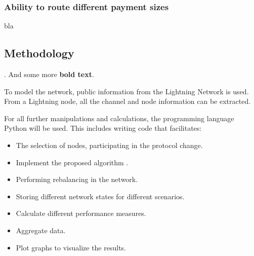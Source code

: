 \documentclass[final]{fhnwreport}       %
\begin{document}
\subsubsection{Ability to route different payment sizes}
bla
\subsection{Methodology}
. And some more \textbf{bold text}.

To model the network, public information from the Lightning Network is used. From a Lightning node, all the channel and node information can be extracted.

For all further manipulations and calculations, the programming language Python will be used. This includes writing code that facilitates: 
\begin{itemize}
  \item The selection of nodes, participating in the protocol change.
  \item Implement the proposed algorithm \cite[p.~3]{pickhardt_imbalance_2019}.
  \item Performing rebalancing in the network.
  \item Storing different network states for different scenarios.
  \item Calculate different performance measures.
  \item Aggregate data.
  \item Plot graphs to visualize the results.
\end{itemize}
\end{document}
